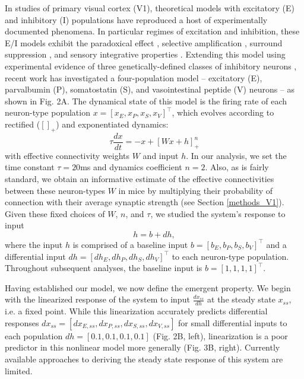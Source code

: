 \documentclass[11pt]{article}
\begin{document}
In studies of primary visual cortex (V1), theoretical models with excitatory (E) and inhibitory (I) populations have reproduced a host of experimentally documented phenomena. 
  In particular regimes of excitation and inhibition, these E/I models exhibit the paradoxical effect \cite{tsodyks1997paradoxical}, selective amplification \cite{murphy2009balanced}, surround suppression \cite{ozeki2009inhibitory}, and  sensory integrative properties \cite{rubin2015stabilized}.  
 Extending this model using experimental evidence of three genetically-defined classes of inhibitory neurons \cite{markram2004interneurons, rudy2011three}, recent work \cite{litwin2016inhibitory} has investigated a four-population model --  excitatory (E), parvalbumin (P), somatostatin (S), and vasointestinal peptide (V) neurons -- as shown in Fig. 2A.
 The dynamical state of this model is the firing rate of each neuron-type population $x = \left[x_E, x_P , x_S, x_V \right]^\top$, which evolves according to rectified ($\left[ \right]_+$) and exponentiated dynamics:
%
\begin{equation}
\tau \frac{dx}{dt} = -x + [W x+ h]_+^n
\end{equation}
%
with effective connectivity weights $W$ and input $h$.  In our analysis, we set the time constant $\tau = 20$ms and dynamics coefficient $n = 2$.  
Also, as is fairly standard, we obtain an informative estimate of the effective connectivities between these neuron-types $W$ in mice by multiplying their probability of connection with their average synaptic strength \cite{allen2018layer, billeh2019systematic} (see Section \ref{methods_V1}).
Given these fixed choices of $W$, $n$, and $\tau$, we studied the system's response to input
\begin{equation}
h = b + dh,
\end{equation} 
where the input $h$ is comprised of a baseline input $b = \left[ b_E, b_P , b_S , b_V \right]^\top$ and a differential input $dh = \left[ dh_E , dh_P , dh_S , dh_V\right]^\top$ to each neuron-type population.  Throughout subsequent analyses, the baseline input is $b = \left[ 1 ,1,1,1\right]^\top$. 

Having established our model, we now define the emergent property. We begin with the linearized response of the system to input $\frac{dx_{ss}}{dh}$ at the steady state $x_{ss}$, i.e. a fixed point. 
While this linearization accurately predicts differential responses $dx_{ss} = \left[ dx_{E,ss} , dx_{P,ss} , dx_{S,ss} ,dx_{V,ss} \right]$  for small differential inputs to each population $dh = \left[ 0.1 , 0.1 , 0.1 , 0.1 \right]$ (Fig. 2B, left), linearization is a poor predictor in this nonlinear model more generally (Fig. 3B, right). 
Currently available approaches to deriving the steady state response of this system are limited.
\end{document}
